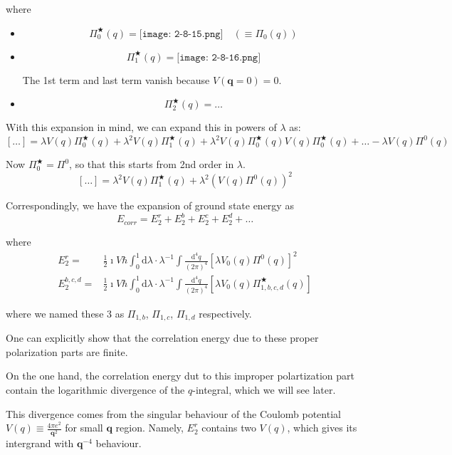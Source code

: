 where
\begin{itemize}
\item \[\Pi_0^\bigstar(q)= \texttt{[image: 2-8-15.png]}\quad(\equiv \Pi_0(q))\]

\item \[\Pi_1^\bigstar(q) = \texttt{[image: 2-8-16.png]} \]

The 1st term and last term vanish because $V(\mathbf{q}=0)=0$.

\item \[\Pi_2^\bigstar(q) = \ldots\]
\end{itemize}

With this expansion in mind, we can expand this in powers of $\lambda$ as:
\[ [\ldots] = \lambda V(q) \Pi_0^\bigstar(q) + \lambda^2 V(q) \Pi_1^\bigstar(q) + \lambda^2 V(q) \Pi_0^\bigstar(q) V(q) \Pi_0^\bigstar(q) + \ldots - \lambda V(q) \Pi^0(q)\]

Now $\Pi_0^\bigstar = \Pi^0$, so that this starts from 2nd order in $\lambda$.
\[ [\ldots] = \lambda^2 V(q) \Pi_1^\bigstar(q) + \lambda^2 \left( V(q) \Pi^0 (q) \right)^2 \]

Correspondingly, we have the expansion of ground state energy as
\[E_{corr} = E_2^r + E_2^b + E_2^c + E_2^d+\ldots\]

where
\[\begin{split}E_2^r =& \frac{1}{2}\imath V \hbar \int_0^1 \mathrm{d} \lambda \cdot \lambda^{-1} \int \frac{\mathrm{d}^4 q}{(2\pi)^4} \left[ \lambda V_0(q)\Pi^0(q) \right]^2\\
E_2^{b,c,d} =& \frac{1}{2}\imath V \hbar \int_0^1 \mathrm{d} \lambda \cdot \lambda^{-1} \int \frac{\mathrm{d}^4 q}{(2\pi)^4} \left[ \lambda V_0(q)\Pi^\bigstar_{1,b,c,d}(q) \right]
 \end{split}\]

where we named these 3 as $\Pi_{1,b}$, $\Pi_{1,c}$, $\Pi_{1,d}$ respectively.

One can explicitly show that the correlation energy due to these proper polarization parts are finite.

On the one hand, the correlation energy dut to this improper polartization part contain the logarithmic divergence of the $q$-integral, which we will see later.

This divergence comes from the singular behaviour of the Coulomb potential $V(q)\equiv \frac{4\pi e^2}{\mathbf{q}^2}$ for small $\mathbf{q}$ region. Namely, $E_2^r$ contains two $V(q)$, which gives its intergrand with $\mathbf{q}^{-4}$ behaviour.

